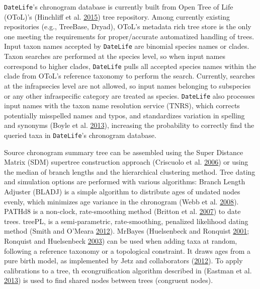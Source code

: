 \documentclass[]{article}
\begin{document}
\texttt{DateLife}'s chronogram database is currently built from Open Tree of Life (OToL)'s
(Hinchliff et al. \protect\hyperlink{ref-Hinchliff2015}{2015}) tree repository. Among currently existing repositories (e.g., TreeBase,
Dryad), OToL's metadata rich tree store is the only one meeting the requirements
for proper/accurate automatized handling of trees.
Input taxon names accepted by \texttt{DateLife} are binomial species names or clades.
Taxon searches are performed at the species level, so when input names correspond
to higher clades,
\texttt{DateLife} pulls all accepted species names within the
clade from OToL's reference taxonomy to perform the search.
Currently, searches at the infrapsecies level are not allowed, so input names belonging to subspecies or any other infraspecific category are treated
as species.
\texttt{DateLife} also processes input names with the taxon name resolution service (TNRS),
which corrects potentially misspelled names and typos, and standardizes variation
in spelling and synonyms (Boyle et al. \protect\hyperlink{ref-Boyle2013}{2013}), increasing the probability to correctly find the
queried
taxa in \texttt{DateLife}'s chronogram database.

Source chronogram summary tree can be assembled using the Super Distance Matrix
(SDM) supertree construction approach (Criscuolo et al. \protect\hyperlink{ref-Criscuolo2006}{2006}) or using the median of branch
lengths and the hierarchical clustering method.
Tree dating and simulation options are performed with various algorithms:
Branch Length Adjuster (BLADJ) is a simple algorithm to distribute ages of undated
nodes evenly, which minimizes age variance in the chronogram (Webb et al. \protect\hyperlink{ref-Webb2008}{2008}).
PATHd8 is a non-clock, rate-smoothing method (Britton et al. \protect\hyperlink{ref-Britton2007}{2007}) to date trees.
treePL, is a semi-parametric, rate-smoothing, penalized likelihood dating method
(Smith and O'Meara \protect\hyperlink{ref-Smith2012}{2012}).
MrBayes (Huelsenbeck and Ronquist \protect\hyperlink{ref-Huelsenbeck2001}{2001}; Ronquist and Huelsenbeck \protect\hyperlink{ref-Ronquist2003}{2003}) can be used when adding taxa at
random, following a reference taxonomy or a topological constraint. It draws ages
from a pure birth model, as implemented by Jetz and collaborators (\protect\hyperlink{ref-Jetz2012}{2012}).
To apply calibrations to a tree, th econgruification algorithm described in (Eastman et al. \protect\hyperlink{ref-Eastman2013}{2013})
is used to find shared nodes between trees (congruent nodes).
\end{document}
